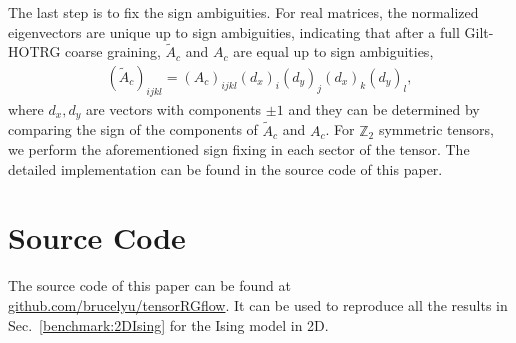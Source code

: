 \documentclass[aps,prb,reprint,superscriptaddress,floatfix]{revtex4-2}
\begin{document}
The last step is to fix the sign ambiguities. For real matrices, the
normalized eigenvectors are unique up to sign ambiguities, indicating
that after a full Gilt-HOTRG coarse graining, $\tilde{A}_c$ and $A_c$
are equal up to sign ambiguities,
%
\begin{align}\label{eq:signAmbi}
    \left(\tilde{A}_c \right)_{ijkl} =
    \left(A_c\right)_{ijkl}(d_x)_i (d_y)_j (d_x)_k (d_y)_l, 
\end{align}
%
where $d_x,d_y$ are vectors with components $\pm 1$ and they can be
determined by comparing the sign of the components of $\tilde{A}_c$ and
$A_c$. For $\mathbb{Z}_2$ symmetric tensors, we perform the
aforementioned sign fixing in each sector of the tensor. The detailed
implementation can be found in the source code of this paper.
%



\section{Source Code}
The source code of this paper can be found at
\href{https://github.com/brucelyu/tensorRGflow}{github.com/brucelyu/tensorRGflow}.
It can be used to reproduce all the results in
Sec.~\ref{benchmark:2DIsing} for the Ising model in 2D.


\end{document}
